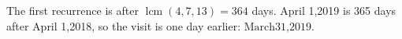 The first recurrence is after $\operatorname{lcm}(4,7,13)=364$ days. April 1,2019 is 365 days after April 1,2018, so the visit is one day earlier: $\boxed{\text{March31,2019}}$.
